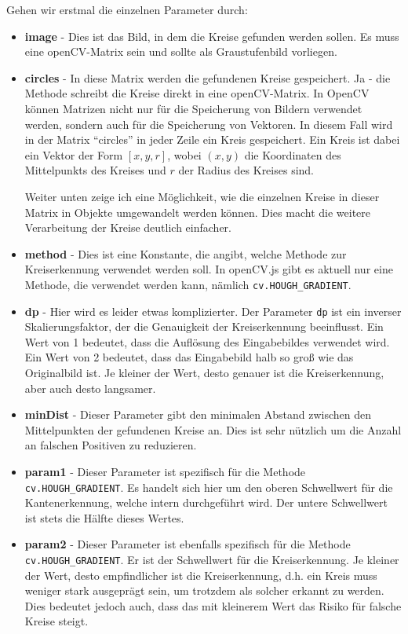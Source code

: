 Gehen wir erstmal die einzelnen Parameter durch:
\begin{itemize}[label={}]
    \item \textbf{image} - Dies ist das Bild, in dem die Kreise gefunden werden sollen. Es muss eine openCV-Matrix sein und sollte als Graustufenbild vorliegen.
    \item \textbf{circles} - In diese Matrix werden die gefundenen Kreise gespeichert. Ja - die Methode schreibt die Kreise direkt in eine openCV-Matrix. In OpenCV können Matrizen nicht nur für die Speicherung von Bildern verwendet werden, sondern auch für die Speicherung von Vektoren. In diesem Fall wird in der Matrix \enquote{circles} in jeder Zeile ein Kreis gespeichert. Ein Kreis ist dabei ein Vektor der Form \([x, y, r]\), wobei \((x, y)\) die Koordinaten des Mittelpunkts des Kreises und \(r\) der Radius des Kreises sind.
    
    Weiter unten zeige ich eine Möglichkeit, wie die einzelnen Kreise in dieser Matrix in Objekte umgewandelt werden können. Dies macht die weitere Verarbeitung der Kreise deutlich einfacher.
    \item \textbf{method} - Dies ist eine Konstante, die angibt, welche Methode zur Kreiserkennung verwendet werden soll. In openCV.js gibt es aktuell nur eine Methode, die verwendet werden kann, nämlich \texttt{cv.HOUGH\_GRADIENT}.
    \item \textbf{dp} - Hier wird es leider etwas komplizierter. Der Parameter \texttt{dp} ist ein inverser Skalierungsfaktor, der die Genauigkeit der Kreiserkennung beeinflusst. Ein Wert von 1 bedeutet, dass die Auflösung des Eingabebildes verwendet wird. Ein Wert von 2 bedeutet, dass das Eingabebild halb so groß wie das Originalbild ist. Je kleiner der Wert, desto genauer ist die Kreiserkennung, aber auch desto langsamer. 
    \item \textbf{minDist} - Dieser Parameter gibt den minimalen Abstand zwischen den Mittelpunkten der gefundenen Kreise an. Dies ist sehr nützlich um die Anzahl an falschen Positiven zu reduzieren. 
    \item \textbf{param1} - Dieser Parameter ist spezifisch für die Methode \texttt{cv.HOUGH\_GRADIENT}. Es handelt sich hier um den oberen Schwellwert für die Kantenerkennung, welche intern durchgeführt wird. Der untere Schwellwert ist stets die Hälfte dieses Wertes.
    \item \textbf{param2} - Dieser Parameter ist ebenfalls spezifisch für die Methode \texttt{cv.HOUGH\_GRADIENT}. Er ist der Schwellwert für die Kreiserkennung. Je kleiner der Wert, desto empfindlicher ist die Kreiserkennung, d.h. ein Kreis muss weniger stark ausgeprägt sein, um trotzdem als solcher erkannt zu werden. Dies bedeutet jedoch auch, dass das mit kleinerem Wert das Risiko für falsche Kreise steigt.
\end{itemize}

